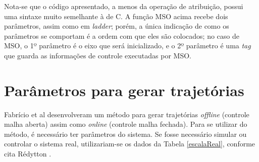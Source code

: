 Nota-se que o código apresentado, a menos da operação de atribuição, possui uma sintaxe muito semelhante à de C. A função MSO acima recebe dois parâmetros, assim como em \textit{ladder}; porém, a única indicação de como os parâmetros se comportam é a ordem com que eles são colocados; no caso de MSO, o 1º parâmetro é o eixo que será inicializado, e o 2º parâmetro é uma \textit{tag} que guarda as informações de controle executadas por MSO.


\section{Parâmetros para gerar trajetórias}

Fabrício et al \cite{fabricioIFAC} desenvolveram um método para gerar trajetórias \textit{offline} (controle malha aberta) assim como \textit{online} (controle malha fechada). Para se utilizar do método, é necessário ter parâmetros do sistema. Se fosse necessário simular ou controlar o sistema real, utilizariam-se os dados da Tabela \ref{escalaReal}, conforme cita Rédytton \cite{redytton}.

